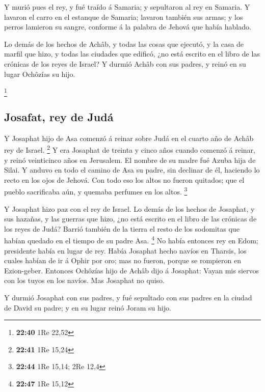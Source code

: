  Y murió pues el rey, y fué traído á Samaria; y sepultaron
al rey en Samaria.  Y lavaron el carro en el estanque de
Samaria; lavaron también sus armas; y los perros lamieron su sangre,
conforme á la palabra de Jehová que había hablado.

 Lo demás de los hechos de Achâb, y todas las cosas que
ejecutó, y la casa de marfil que hizo, y todas las ciudades que edificó,
¿no está escrito en el libro de las crónicas de los reyes de Israel?
 Y durmió Achâb con sus padres, y reinó en su lugar
Ochôzías su hijo.

\footnote{\textbf{22:40} 1Re 22,52}

\hypertarget{josafat-rey-de-juduxe1}{%
\subsection{Josafat, rey de Judá}\label{josafat-rey-de-juduxe1}}

 Y Josaphat hijo de Asa comenzó á reinar sobre Judá en el
cuarto año de Achâb rey de Israel. \footnote{\textbf{22:41} 1Re 15,24}
 Y era Josaphat de treinta y cinco años cuando comenzó á
reinar, y reinó veinticinco años en Jerusalem. El nombre de su madre fué
Azuba hija de Silai.  Y anduvo en todo el camino de Asa su
padre, sin declinar de él, haciendo lo recto en los ojos de Jehová.
 Con todo eso los altos no fueron quitados; que el pueblo
sacrificaba aún, y quemaba perfumes en los altos. \footnote{\textbf{22:44}
  1Re 15,14; 2Re 12,4}

 Y Josaphat hizo paz con el rey de Israel.  Lo
demás de los hechos de Josaphat, y sus hazañas, y las guerras que hizo,
¿no está escrito en el libro de las crónicas de los reyes de Judá?
 Barrió también de la tierra el resto de los sodomitas que
habían quedado en el tiempo de su padre Asa. \footnote{\textbf{22:47}
  1Re 15,12}  No había entonces rey en Edom; presidente
había en lugar de rey.  Había Josaphat hecho navíos en
Tharsis, los cuales habían de ir á Ophir por oro; mas no fueron, porque
se rompieron en Ezion-geber.  Entonces Ochôzías hijo de
Achâb dijo á Josaphat: Vayan mis siervos con los tuyos en los navíos.
Mas Josaphat no quiso.

 Y durmió Josaphat con sus padres, y fué sepultado con sus
padres en la ciudad de David su padre; y en su lugar reinó Joram su
hijo.

